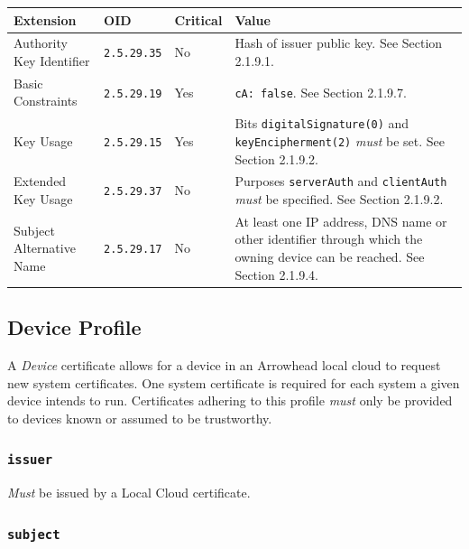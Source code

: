 \vspace*{0.5cm}
\noindent\begin{tabularx}{\textwidth}{| p{4cm} | p{2cm} | p{1.2cm} | X |} \hline
\rowcolor{gray!33} Extension & OID                & Critical & Value \\ \hline

Authority Key Identifier     & \texttt{2.5.29.35} & No       & Hash of issuer public key. See Section 2.1.9.1. \\ \hline
Basic Constraints            & \texttt{2.5.29.19} & Yes      & \texttt{cA: false}. See Section 2.1.9.7. \\ \hline
Key Usage                    & \texttt{2.5.29.15} & Yes      & Bits \texttt{digitalSignature(0)} and \texttt{keyEncipherment(2)} \textit{must} be set. See Section 2.1.9.2. \\ \hline
Extended Key Usage           & \texttt{2.5.29.37} & No       & Purposes \texttt{serverAuth} and \texttt{clientAuth} \textit{must} be specified. See Section 2.1.9.2. \\ \hline
Subject Alternative Name     & \texttt{2.5.29.17} & No       & At least one IP address, DNS name or other identifier through which the owning device can be reached. See Section 2.1.9.4. \\ \hline

\end{tabularx}
\vspace*{0.5cm}

\newpage
\subsection{Device Profile}

A \textit{Device} certificate allows for a device in an Arrowhead local cloud to request new system certificates.
One system certificate is required for each system a given device intends to run.
Certificates adhering to this profile \textit{must} only be provided to devices known or assumed to be trustworthy.

\subsubsection{\texttt{issuer}}

\textit{Must} be issued by a Local Cloud certificate.

\subsubsection{\texttt{subject}}

